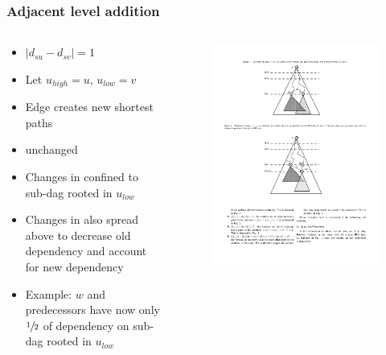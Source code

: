 \begin{frame}
  \frametitle{Adjacent level addition}
  \begin{columns}[onlytextwidth]
  
    \begin{column}{0.5\textwidth}
      \begin{itemize}
        \item $|d_{su} - d_{sv}| = 1$
        \item Let $u_{high} = u ,\, u_{low} = v$
        \item Edge creates new shortest paths
        \item \spdag unchanged
        \item Changes in \paths confined to sub-dag rooted in $u_{low}$
        \item Changes in \dep also spread above to decrease old dependency and account for new dependency
        \item Example: $w$ and predecessors have now only $\sfrac{1}{2}$ of dependency on sub-dag rooted in $u_{low}$
      \end{itemize}
    \end{column}
    
    \begin{column}{0.5\textwidth}
      \begin{figure}[t]
        \centering
        \includegraphics[width=\textwidth, height=\textheight, keepaspectratio]{imgs/green-1lvl-compressed}
      \end{figure}
    \end{column}
  \end{columns}
    
\end{frame}


